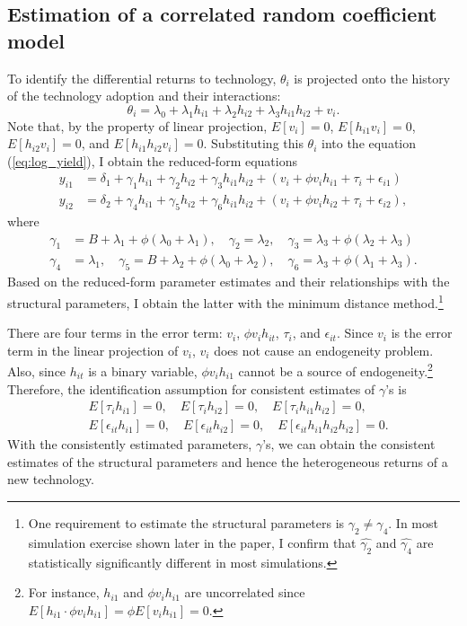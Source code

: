 \documentclass[11pt,letterpaper]{article}
\begin{document}
\subsection{Estimation of a correlated random coefficient model}

To identify the differential returns to technology, $\theta_i$ is projected onto the history of the technology adoption and their interactions:
\begin{equation}\label{eq:linear_projection}
  \theta_i = \lambda_0 + \lambda_1 h_{i1} + \lambda_2 h_{i2} + \lambda_3 h_{i1} h_{i2} + v_i.
\end{equation}
Note that, by the property of linear projection, $E[v_i] = 0$, $E[h_{i1} v_i] = 0$, $E[h_{i2} v_i] = 0$, and $E[h_{i1} h_{i2} v_i] = 0$.
Substituting this $\theta_i$ into the equation (\ref{eq:log_yield}), I obtain the reduced-form equations
\begin{align*}
  y_{i1} &= \delta_1 + \gamma_1 h_{i1} + \gamma_2 h_{i2} + \gamma_3 h_{i1} h_{i2} + (v_i + \phi v_i h_{i1} + \tau_i + \epsilon_{i1}) \\
  y_{i2} &= \delta_2 + \gamma_4 h_{i1} + \gamma_5 h_{i2} + \gamma_6 h_{i1} h_{i2} + (v_i + \phi v_i h_{i2} + \tau_i + \epsilon_{i2}),
\end{align*}
where
\begin{align*}
  \gamma_1 &= B + \lambda_1 + \phi (\lambda_0 + \lambda_1), \quad \gamma_2 = \lambda_2, \quad \gamma_3 = \lambda_3 + \phi (\lambda_2 + \lambda_3) \\
  \gamma_4 &= \lambda_1, \quad  \gamma_5 = B + \lambda_2 + \phi (\lambda_0 + \lambda_2), \quad \gamma_6 = \lambda_3 + \phi (\lambda_1 + \lambda_3).
\end{align*}
Based on the reduced-form parameter estimates and their relationships with the structural parameters, I obtain the latter with the minimum distance method.\footnote{
  One requirement to estimate the structural parameters is $\gamma_2 \ne \gamma_4$.
  In most simulation exercise shown later in the paper, I confirm that $\widehat{\gamma_2}$ and $\widehat{\gamma_4}$ are statistically significantly different in most simulations.
}

There are four terms in the error term: $v_i$, $\phi v_i h_{it}$, $\tau_i$, and $\epsilon_{it}$.
Since $v_i$ is the error term in the linear projection of $v_i$, $v_i$ does not cause an endogeneity problem.
Also, since $h_{it}$ is a binary variable, $\phi v_i h_{i1}$ cannot be a source of endogeneity.\footnote{
  For instance, $h_{i1}$ and $\phi v_i h_{i1}$ are uncorrelated since $E[h_{i1} \cdot \phi v_i h_{i1}] = \phi E[v_i h_{i1}] = 0$.
}
Therefore, the identification assumption for consistent estimates of $\gamma$'s is 
\begin{align}
  &E[\tau_i h_{i1}] = 0, \quad E[\tau_i h_{i2}] = 0, \quad E[\tau_i h_{i1} h_{i2}] = 0, \label{eq:tau_h} \\
  &E[\epsilon_{it} h_{i1}] = 0, \quad E[\epsilon_{it} h_{i2}] = 0, \quad E[\epsilon_{it} h_{i1} h_{i2} h_{i2}] = 0. \label{eq:epsilon_h}
\end{align}
With the consistently estimated parameters, $\gamma$'s, we can obtain the consistent estimates of the structural parameters and hence the heterogeneous returns of a new technology.
\end{document}

